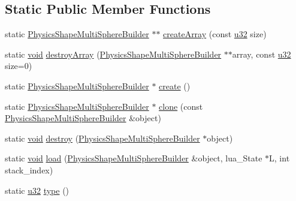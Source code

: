\subsection*{Static Public Member Functions}
\begin{DoxyCompactItemize}
\item 
static \mbox{\hyperlink{classnjli_1_1_physics_shape_multi_sphere_builder}{Physics\+Shape\+Multi\+Sphere\+Builder}} $\ast$$\ast$ \mbox{\hyperlink{classnjli_1_1_physics_shape_multi_sphere_builder_a1bd6afbd215f295368f84c18eef4648a}{create\+Array}} (const \mbox{\hyperlink{_util_8h_a10e94b422ef0c20dcdec20d31a1f5049}{u32}} size)
\item 
static \mbox{\hyperlink{_thread_8h_af1e856da2e658414cb2456cb6f7ebc66}{void}} \mbox{\hyperlink{classnjli_1_1_physics_shape_multi_sphere_builder_a63c86d52b855bce35d47a4e5a14aa805}{destroy\+Array}} (\mbox{\hyperlink{classnjli_1_1_physics_shape_multi_sphere_builder}{Physics\+Shape\+Multi\+Sphere\+Builder}} $\ast$$\ast$array, const \mbox{\hyperlink{_util_8h_a10e94b422ef0c20dcdec20d31a1f5049}{u32}} size=0)
\item 
static \mbox{\hyperlink{classnjli_1_1_physics_shape_multi_sphere_builder}{Physics\+Shape\+Multi\+Sphere\+Builder}} $\ast$ \mbox{\hyperlink{classnjli_1_1_physics_shape_multi_sphere_builder_ac2eab3049d19f25208af91e822eb477a}{create}} ()
\item 
static \mbox{\hyperlink{classnjli_1_1_physics_shape_multi_sphere_builder}{Physics\+Shape\+Multi\+Sphere\+Builder}} $\ast$ \mbox{\hyperlink{classnjli_1_1_physics_shape_multi_sphere_builder_a29dfd115d30f7459523d0df50d055dc8}{clone}} (const \mbox{\hyperlink{classnjli_1_1_physics_shape_multi_sphere_builder}{Physics\+Shape\+Multi\+Sphere\+Builder}} \&object)
\item 
static \mbox{\hyperlink{_thread_8h_af1e856da2e658414cb2456cb6f7ebc66}{void}} \mbox{\hyperlink{classnjli_1_1_physics_shape_multi_sphere_builder_a3f59fd995d271b2d7dfa469c8ec41ccb}{destroy}} (\mbox{\hyperlink{classnjli_1_1_physics_shape_multi_sphere_builder}{Physics\+Shape\+Multi\+Sphere\+Builder}} $\ast$object)
\item 
static \mbox{\hyperlink{_thread_8h_af1e856da2e658414cb2456cb6f7ebc66}{void}} \mbox{\hyperlink{classnjli_1_1_physics_shape_multi_sphere_builder_a4110b157cd4e6f95b8de049ae2b00537}{load}} (\mbox{\hyperlink{classnjli_1_1_physics_shape_multi_sphere_builder}{Physics\+Shape\+Multi\+Sphere\+Builder}} \&object, lua\+\_\+\+State $\ast$L, int stack\+\_\+index)
\item 
static \mbox{\hyperlink{_util_8h_a10e94b422ef0c20dcdec20d31a1f5049}{u32}} \mbox{\hyperlink{classnjli_1_1_physics_shape_multi_sphere_builder_aa227e639fe36d060dd20c46fa356e893}{type}} ()
\end{DoxyCompactItemize}
